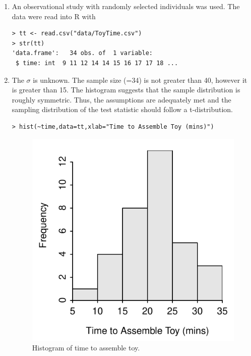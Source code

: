 \documentclass[10pt,openany]{book}\usepackage[]{graphicx}\usepackage[]{color}
\makeatletter
\newenvironment{kframe}{%
 \def\at@end@of@kframe{}%
 \ifinner\ifhmode%
  \def\at@end@of@kframe{\end{minipage}}%
  \begin{minipage}{\columnwidth}%
 \fi\fi%
 \def\FrameCommand##1{\hskip\@totalleftmargin \hskip-\fboxsep
 \colorbox{shadecolor}{##1}\hskip-\fboxsep
     \hskip-\linewidth \hskip-\@totalleftmargin \hskip\columnwidth}%
 \MakeFramed {\advance\hsize-\width
   \@totalleftmargin\z@ \linewidth\hsize
   \@setminipage}}%
 {\par\unskip\endMakeFramed%
 \at@end@of@kframe}
\newenvironment{knitrout}{}{} %
\makeatother
\begin{document}
\begin{itemize}
\begin{enumerate}
      \item An observational study with randomly selected individuals was used.  The data were read into R with
\begin{knitrout}
\color{fgcolor}\begin{kframe}
\begin{verbatim}
> tt <- read.csv("data/ToyTime.csv")
> str(tt)
'data.frame':	34 obs. of  1 variable:
 $ time: int  9 11 12 14 14 15 16 17 17 18 ...
\end{verbatim}
\end{kframe}
\end{knitrout}
      \item The $\sigma$ is unknown.  The sample size (=34) is not greater than 40, however it is greater than 15.  The histogram  suggests that the sample distribution is roughly symmetric.  Thus, the assumptions are adequately met and the sampling distribution of the test statistic should follow a t-distribution.
\begin{knitrout}
\color{fgcolor}\begin{kframe}
\begin{verbatim}
> hist(~time,data=tt,xlab="Time to Assemble Toy (mins)")
\end{verbatim}
\end{kframe}\begin{figure}[hbtp]

{\centering \includegraphics[width=.4\linewidth]{Figs/ToyTimeHist-1} 

}

\caption[Histogram of time to assemble toy]{Histogram of time to assemble toy.}\label{fig:ToyTimeHist}
\end{figure}



\end{knitrout}
\end{enumerate}
\end{itemize}
\end{document}

